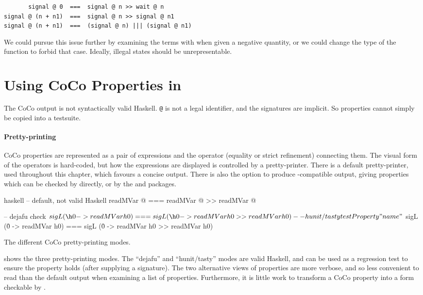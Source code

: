 \begin{verbatim}
       signal @ 0  ===  signal @ n >> wait @ n
signal @ (n + n1)  ===  signal @ n >> signal @ n1
signal @ (n + n1)  ===  (signal @ n) ||| (signal @ n1)
\end{verbatim}

We could pursue this issue further by examining the terms with
\dejafu{} when given a negative quantity, or we could change the type
of the function to forbid that case.  Ideally, illegal states should
be unrepresentable.

\section{Using CoCo Properties in \dejafu{}}
\label{sec:coco-dejafu}

The CoCo output is not syntactically valid Haskell.  \texttt{@} is not
a legal identifier, and the signatures are implicit.  So properties
cannot simply be copied into a testsuite.

\paragraph{Pretty-printing}
CoCo properties are represented as a pair of expressions and the
operator (equality or strict refinement) connecting them.  The visual
form of the operators is hard-coded, but how the expressions are
displayed is controlled by a pretty-printer.  There is a default
pretty-printer, used throughout this chapter, which favours a concise
output.  There is also the option to produce \dejafu{}-compatible
output, giving properties which can be checked by \dejafu{} directly,
or by the  and  packages.

\begin{listing}
  \centering
  \begin{cminted}{haskell}
-- default, not valid Haskell
readMVar @  ===  readMVar @ >> readMVar @

-- dejafu
check $ sigL (\h0 -> readMVar h0) === sigL (\h0 -> readMVar h0 >> readMVar h0)

-- hunit/tasty
testProperty "name" $
  sigL (\h0 -> readMVar h0) === sigL (\h0 -> readMVar h0 >> readMVar h0)
  \end{cminted}
  \caption{The different CoCo pretty-printing modes.}\label{lst:coco_ppr}
\end{listing}

 shows the three pretty-printing modes.  The
``dejafu'' and ``hunit/tasty'' modes are valid Haskell, and can be
used as a regression test to ensure the property holds (after
supplying a signature).  The two alternative views of properties are
more verbose, and so less convenient to read than the default output
when examining a list of properties.  Furthermore, it is little work
to transform a CoCo property into a form checkable by \dejafu{}.

